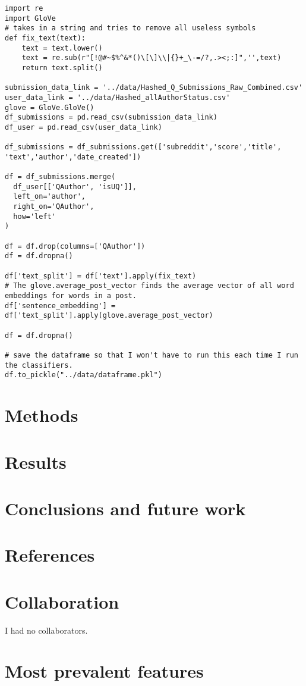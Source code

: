 \documentclass{article}
\begin{document}
\begin{verbatim}
import re
import GloVe
# takes in a string and tries to remove all useless symbols
def fix_text(text):
    text = text.lower()
    text = re.sub(r"[!@#~$%^&*()\[\]\\|{}+_\-=/?,.><;:]",'',text)
    return text.split()

submission_data_link = '../data/Hashed_Q_Submissions_Raw_Combined.csv'
user_data_link = '../data/Hashed_allAuthorStatus.csv'
glove = GloVe.GloVe()
df_submissions = pd.read_csv(submission_data_link)
df_user = pd.read_csv(user_data_link)

df_submissions = df_submissions.get(['subreddit','score','title', 'text','author','date_created'])

df = df_submissions.merge(
  df_user[['QAuthor', 'isUQ']],
  left_on='author',
  right_on='QAuthor',
  how='left'
)

df = df.drop(columns=['QAuthor'])
df = df.dropna()

df['text_split'] = df['text'].apply(fix_text)
# The glove.average_post_vector finds the average vector of all word embeddings for words in a post.
df['sentence_embedding'] = df['text_split'].apply(glove.average_post_vector)

df = df.dropna()

# save the dataframe so that I won't have to run this each time I run the classifiers.
df.to_pickle("../data/dataframe.pkl")
\end{verbatim}

\section{Methods}
\section{Results}
\section{Conclusions and future work}
\section{References}
\section{Collaboration}
I had no collaborators.

\section{Most prevalent features}
\end{document}
